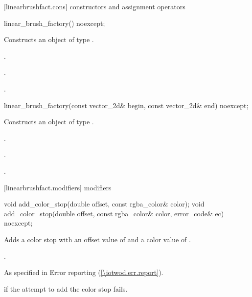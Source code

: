  [linearbrushfact.cons] { constructors and assignment operators}

\begin{itemdecl}
    linear_brush_factory() noexcept;
\end{itemdecl}
\begin{itemdescr}
	\pnum
	\effects
	Constructs an object of type .
	
	\pnum
	\postconditions
	.

	\pnum
	.
	
	\pnum
	.
	
\end{itemdescr}

\begin{itemdecl}
    linear_brush_factory(const vector_2d& begin, const vector_2d& end) noexcept;
\end{itemdecl}
\begin{itemdescr}
	\pnum
	\effects
	Constructs an object of type .
	
	\pnum
	\postconditions
	.
	
	\pnum
	.
	
	\pnum
	.
	
\end{itemdescr}

 [linearbrushfact.modifiers] { modifiers}

\begin{itemdecl}
    void add_color_stop(double offset, const rgba_color& color);
    void add_color_stop(double offset, const rgba_color& color, 
      error_code& ec) noexcept;
\end{itemdecl}
\begin{itemdescr}
	\pnum
	\effects
	Adds a color stop with an offset value of  and a color value of .
	
	\pnum
	\postconditions
	.
	
	\pnum
	\throws
	As specified in Error reporting (\ref{\iotwod.err.report}).
	
	\pnum
	\errors
	 if the attempt to add the color stop fails.
	
\end{itemdescr}

